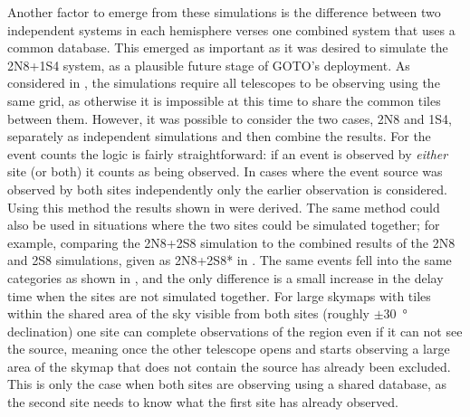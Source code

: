 \begin{colsection}
\begin{colsection}
Another factor to emerge from these simulations is the difference between two independent systems in each hemisphere verses one combined system that uses a common database. This emerged as important as it was desired to simulate the 2N8+1S4 system, as a plausible future stage of GOTO's deployment. As considered in , the simulations require all telescopes to be observing using the same grid, as otherwise it is impossible at this time to share the common tiles between them. However, it was possible to consider the two cases, 2N8 and 1S4, separately as independent simulations and then combine the results. For the event counts the logic is fairly straightforward: if an event is observed by \emph{either} site (or both) it counts as being observed. In cases where the event source was observed by both sites independently only the earlier observation is considered. Using this method the results shown in  were derived. The same method could also be used in situations where the two sites could be simulated together; for example, comparing the 2N8+2S8 simulation to the combined results of the 2N8 and 2S8 simulations, given as 2N8+2S8* in . The same events fell into the same categories as shown in , and the only difference is a small increase in the delay time when the sites are not simulated together. For large skymaps with tiles within the shared area of the sky visible from both sites (roughly $\pm$\SI{30}{\degree} declination) one site can complete observations of the region even if it can not see the source, meaning once the other telescope opens and starts observing a large area of the skymap that does not contain the source has already been excluded. This is only the case when both sites are observing using a shared database, as the second site needs to know what the first site has already observed.

\end{colsection}


\end{colsection}


\newpage
